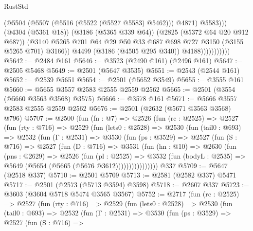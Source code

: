\begin{lexlean}{RustStd}
\begin{coremodule}
                                  (@5504 (@5507 (@5516 (@5522 (@5527 @5583) @5462))) @4871)
                                  @5583)))
                            (@4304 (@5361 @18))
                            (@3186 (@5365 @339 @64))
                            (@2825 (@5372 @64 @20 @912 @687))
                            (@3140
                              @5265
                              @701
                              @64
                              @29
                              @50
                              @33
                              @687
                              @698
                              @727
                              @3150
                              (@3155 @5265 @701)
                              @3166))
                          @4499
                          (@3186 (@4505 @295 @340))
                          @4188)))))))))))
@5642 := @2484 @161
@5646 := @3523 (@2490 @161) (@2496 @161)
@5647 := @2505 @5468
@5649 := @2501 (@5647 @3535)
@5651 := @2543 (@2544 @161)
@5652 := @2539 @5651
@5654 := @2501 (@5652 @3549)
@5655 := @3555 @161
@5660 := @5655 @3557 @2583 @2555 @2559 @2562
@5665 := @2501 (@3554 (@5660 @3563 @3568) @3575)
@5666 := @3578 @161
@5671 := @5666 @3557 @2583 @2555 @2559 @2562
@5676 := @2501 (@2632 (@5671 @3563 @3568) @796)
@5707 := @2500
    (fun (fn : @7) =>
    @2526
      (fun (rc : @2525) =>
      @2527
        (fun (rty : @716) =>
        @2529
          (fun (lets0 : @2528) =>
          @2530
            (fun (tail0 : @693) =>
            @2532
              (fun (Γ : @2531) =>
              @3530
                (fun (ps : @3529) =>
                @2527
                  (fun (S : @716) =>
                  @2527
                    (fun (D : @716) =>
                    @3531
                      (fun (hn : @10) =>
                      @2630
                        (fun (pns : @2629) =>
                        @2526
                          (fun (pl : @2525) =>
                          @3532
                            (fun (bodyL : @2535) => @5649 (@5654 (@5665 (@5676 @3612))))))))))))))))
    @337
@5709 := @5647 (@2518 @337)
@5710 := @2501 @5709
@5713 := @2581 (@2582 @337) @5471
@5717 := @2501 (@2573 (@5713 @3594) @3598)
@5718 := @2607 @337
@5723 := @3603 (@3604 @5718 @5474 @3565 @3567)
@5752 := @2717
    (fun (rc : @2525) =>
    @2527
      (fun (rty : @716) =>
      @2529
        (fun (lets0 : @2528) =>
        @2530
          (fun (tail0 : @693) =>
          @2532
            (fun (Γ : @2531) =>
            @3530
              (fun (ps : @3529) =>
              @2527
                (fun (S : @716) =>

\end{coremodule}
\end{lexlean}
